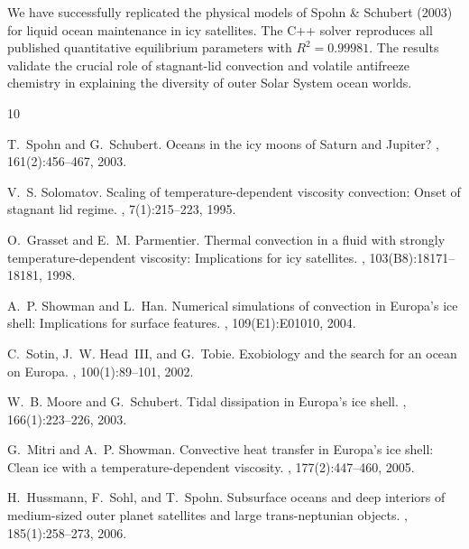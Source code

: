 \documentclass[10pt,twocolumn,letterpaper]{article}
\begin{document}
We have successfully replicated the physical models of Spohn \& Schubert (2003) for liquid ocean maintenance in icy satellites. The C++ solver reproduces all published quantitative equilibrium parameters with $R^2 = 0.99981$. The results validate the crucial role of stagnant-lid convection and volatile antifreeze chemistry in explaining the diversity of outer Solar System ocean worlds.


\begin{thebibliography}{10}

T.~Spohn and G.~Schubert.
\newblock Oceans in the icy moons of {Saturn} and {Jupiter}?
, 161(2):456--467, 2003.

V.~S. Solomatov.
\newblock Scaling of temperature-dependent viscosity convection: {Onset} of stagnant lid regime.
, 7(1):215--223, 1995.

O.~Grasset and E.~M. Parmentier.
\newblock Thermal convection in a fluid with strongly temperature-dependent viscosity: {Implications} for icy satellites.
, 103(B8):18171--18181, 1998.

A.~P. Showman and L.~Han.
\newblock Numerical simulations of convection in {Europa's} ice shell: {Implications} for surface features.
, 109(E1):E01010, 2004.

C.~Sotin, J.~W. Head~III, and G.~Tobie.
\newblock Exobiology and the search for an ocean on {Europa}.
, 100(1):89--101, 2002.

W.~B. Moore and G.~Schubert.
\newblock Tidal dissipation in {Europa's} ice shell.
, 166(1):223--226, 2003.

G.~Mitri and A.~P. Showman.
\newblock Convective heat transfer in {Europa's} ice shell: {Clean} ice with a temperature-dependent viscosity.
, 177(2):447--460, 2005.

H.~Hussmann, F.~Sohl, and T.~Spohn.
\newblock Subsurface oceans and deep interiors of medium-sized outer planet satellites and large trans-neptunian objects.
, 185(1):258--273, 2006.

\end{thebibliography}
\end{document}
